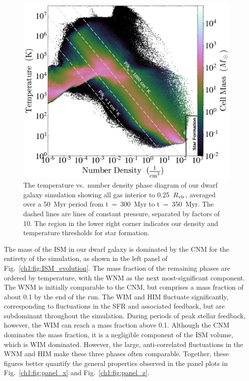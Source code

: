\begin{figure}
\includegraphics[width=0.95\linewidth]{figures/ch1/phase_diagram.png}
\caption{The temperature vs.\ number density phase diagram of our dwarf galaxy simulation showing all gas interior to 0.25~$R_{\rm vir}$, averaged over a 50~Myr period from t~=~300~Myr to t~=~350~Myr. The dashed lines are lines of constant pressure, separated by factors of 10. The region in the lower right corner indicates our density and temperature thresholds for star formation.}
\label{ch1:fig:phase}
\end{figure}

The mass of the ISM in our dwarf galaxy is dominated by the CNM for the entirety of the simulation, as shown in the left panel of Fig.~\ref{ch1:fig:ISM_evolution}. The mass fraction of the remaining phases are ordered by temperature, with the WNM as the next most-significant component. The WNM is initially comparable to the CNM, but comprises a mass fraction of about 0.1 by the end of the run. The WIM and HIM fluctuate significantly, corresponding to fluctuations in the SFR and associated feedback, but are subdominant throughout the simulation. During periods of peak stellar feedback, however, the WIM can reach a mass fraction above 0.1. Although the CNM dominates the mass fraction, it is a negligible component of the ISM volume, which is WIM dominated. However, the large, anti-correlated fluctuations in the WNM and HIM make these three phases often comparable. Together, these figures better quantify the general properties observed in the panel plots in Fig.~\ref{ch1:fig:panel_x} and Fig.~\ref{ch1:fig:panel_z}.

